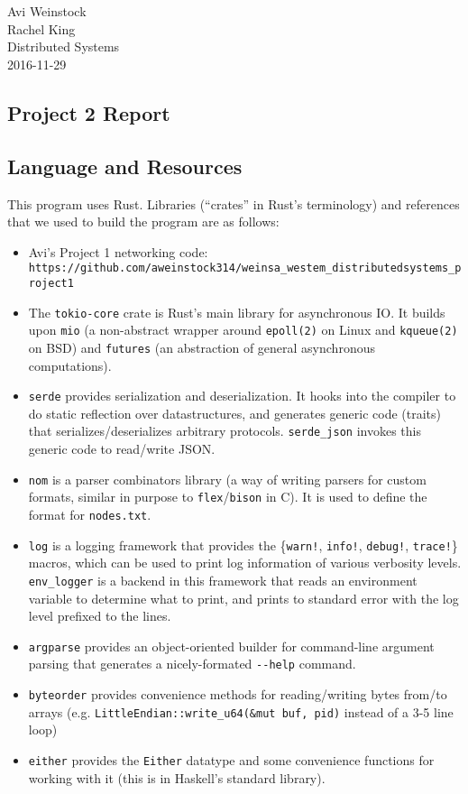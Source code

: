 \documentclass{article}
\begin{document}
\section*{}
Avi Weinstock \\
Rachel King \\
Distributed Systems\\
2016-11-29

\begin{center}
    \section*{Project 2 Report}
\end{center}

\subsection*{Language and Resources}
    This program uses Rust. Libraries (``crates'' in Rust's terminology) and references that we used to build the program are as follows:
\begin{itemize}
    \item Avi's Project 1 networking code: \verb|https://github.com/aweinstock314/weinsa_westem_distributedsystems_project1|
    \item The \verb|tokio-core| crate is Rust's main library for asynchronous IO. It builds upon \verb|mio| (a non-abstract wrapper around \verb|epoll(2)| on Linux and \verb|kqueue(2)| on BSD) and \verb|futures| (an abstraction of general asynchronous computations).
    \item \verb|serde| provides serialization and deserialization. It hooks into the compiler to do static reflection over datastructures, and generates generic code (traits) that serializes/deserializes arbitrary protocols. \verb|serde_json| invokes this generic code to read/write JSON.
    \item \verb|nom| is a parser combinators library (a way of writing parsers for custom formats, similar in purpose to \verb|flex|/\verb|bison| in C). It is used to define the format for \verb|nodes.txt|.
    \item \verb|log| is a logging framework that provides the \{\verb|warn!|, \verb|info!|, \verb|debug!|, \verb|trace!|\} macros, which can be used to print log information of various verbosity levels. \verb|env_logger| is a backend in this framework that reads an environment variable to determine what to print, and prints to standard error with the log level prefixed to the lines.
    \item \verb|argparse| provides an object-oriented builder for command-line argument parsing that generates a nicely-formated \verb|--help| command.
    \item \verb|byteorder| provides convenience methods for reading/writing bytes from/to arrays (e.g. \verb|LittleEndian::write_u64(&mut buf, pid)| instead of a 3-5 line loop)
    \item \verb|either| provides the \verb|Either| datatype and some convenience functions for working with it (this is in Haskell's standard library). 
\end{itemize}
\end{document}
